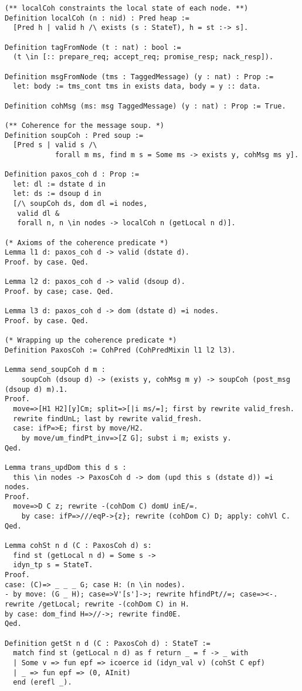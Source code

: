 \begin{landscape}
\begin{multicols*}{2}
\begin{lstlisting}[style=SourceCodeListing]
(** localCoh constraints the local state of each node. **)
Definition localCoh (n : nid) : Pred heap :=
  [Pred h | valid h /\ exists (s : StateT), h = st :-> s].

Definition tagFromNode (t : nat) : bool :=
  (t \in [:: prepare_req; accept_req; promise_resp; nack_resp]).

Definition msgFromNode (tms : TaggedMessage) (y : nat) : Prop :=
  let: body := tms_cont tms in exists data, body = y :: data.

Definition cohMsg (ms: msg TaggedMessage) (y : nat) : Prop := True.

(** Coherence for the message soup. *)
Definition soupCoh : Pred soup :=
  [Pred s | valid s /\
            forall m ms, find m s = Some ms -> exists y, cohMsg ms y].

Definition paxos_coh d : Prop :=
  let: dl := dstate d in
  let: ds := dsoup d in
  [/\ soupCoh ds, dom dl =i nodes,
   valid dl &
   forall n, n \in nodes -> localCoh n (getLocal n d)].

(* Axioms of the coherence predicate *)
Lemma l1 d: paxos_coh d -> valid (dstate d).
Proof. by case. Qed.

Lemma l2 d: paxos_coh d -> valid (dsoup d).
Proof. by case; case. Qed.

Lemma l3 d: paxos_coh d -> dom (dstate d) =i nodes.
Proof. by case. Qed.

(* Wrapping up the coherence predicate *)
Definition PaxosCoh := CohPred (CohPredMixin l1 l2 l3).

Lemma send_soupCoh d m :
    soupCoh (dsoup d) -> (exists y, cohMsg m y) -> soupCoh (post_msg (dsoup d) m).1.
Proof.
  move=>[H1 H2][y]Cm; split=>[|i ms/=]; first by rewrite valid_fresh.
  rewrite findUnL; last by rewrite valid_fresh.
  case: ifP=>E; first by move/H2.
    by move/um_findPt_inv=>[Z G]; subst i m; exists y.
Qed.

Lemma trans_updDom this d s :
  this \in nodes -> PaxosCoh d -> dom (upd this s (dstate d)) =i nodes.
Proof.
  move=>D C z; rewrite -(cohDom C) domU inE/=.
    by case: ifP=>///eqP->{z}; rewrite (cohDom C) D; apply: cohVl C.
Qed.

Lemma cohSt n d (C : PaxosCoh d) s:
  find st (getLocal n d) = Some s ->
  idyn_tp s = StateT.
Proof.
case: (C)=> _ _ _ G; case H: (n \in nodes).
- by move: (G _ H); case=>V'[s']->; rewrite hfindPt//=; case=><-.
rewrite /getLocal; rewrite -(cohDom C) in H.
by case: dom_find H=>//->; rewrite find0E.
Qed.

Definition getSt n d (C : PaxosCoh d) : StateT :=
  match find st (getLocal n d) as f return _ = f -> _ with
  | Some v => fun epf => icoerce id (idyn_val v) (cohSt C epf)
  | _ => fun epf => (0, AInit)
  end (erefl _).


\end{lstlisting}
\end{multicols*}
\end{landscape}
